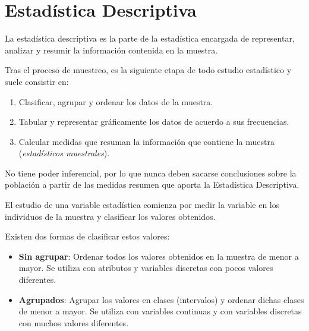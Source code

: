 \documentclass[
  a4paper,
]{scrreport}
\theoremstyle{definition}
\theoremstyle{definition}
\theoremstyle{plain}
\theoremstyle{remark}
\begin{document}

\hypertarget{estaduxedstica-descriptiva}{%
\chapter{Estadística Descriptiva}\label{estaduxedstica-descriptiva}}

La estadística descriptiva es la parte de la estadística encargada de
representar, analizar y resumir la información contenida en la muestra.

Tras el proceso de muestreo, es la siguiente etapa de todo estudio
estadístico y suele consistir en:

\begin{enumerate}
\def\labelenumi{\arabic{enumi}.}
\item
  Clasificar, agrupar y ordenar los datos de la muestra.
\item
  Tabular y representar gráficamente los datos de acuerdo a sus
  frecuencias.
\item
  Calcular medidas que resuman la información que contiene la muestra
  (\emph{estadísticos muestrales}).
\end{enumerate}

\begin{tcolorbox}[enhanced jigsaw, bottomtitle=1mm, colbacktitle=quarto-callout-important-color!10!white, breakable, toptitle=1mm, colframe=quarto-callout-important-color-frame, coltitle=black, title=\textcolor{quarto-callout-important-color}{\faExclamation}\hspace{0.5em}{Importante}, toprule=.15mm, rightrule=.15mm, opacitybacktitle=0.6, opacityback=0, arc=.35mm, bottomrule=.15mm, leftrule=.75mm, left=2mm, titlerule=0mm, colback=white]

No tiene poder inferencial, por lo que nunca deben sacarse conclusiones
sobre la población a partir de las medidas resumen que aporta la
Estadística Descriptiva.

\end{tcolorbox}

El estudio de una variable estadística comienza por medir la variable en
los individuos de la muestra y clasificar los valores obtenidos.

Existen dos formas de clasificar estos valores:

\begin{itemize}
\item
  \textbf{Sin agrupar}: Ordenar todos los valores obtenidos en la
  muestra de menor a mayor. Se utiliza con atributos y variables
  discretas con pocos valores diferentes.
\item
  \textbf{Agrupados}: Agrupar los valores en clases (intervalos) y
  ordenar dichas clases de menor a mayor. Se utiliza con variables
  continuas y con variables discretas con muchos valores diferentes.
\end{itemize}
\end{document}
